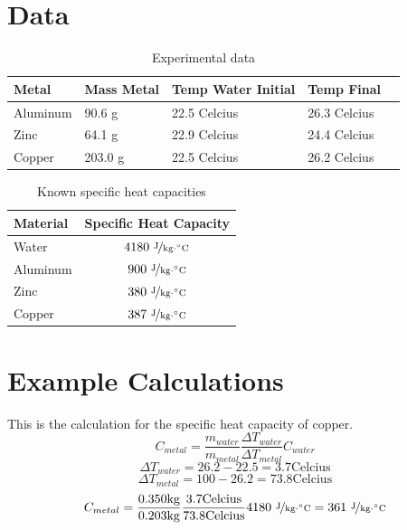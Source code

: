 \documentclass{article}
\begin{document}
\section{Data}

\begin{table}[htbp]
\begin{center}
\footnotesize
\begin{tabular}{lllll}
\toprule
 Metal   & Mass Metal & Temp Water Initial & Temp Final \\                                                      
\midrule
  
    Aluminum   & 90.6 g           & 22.5 Celcius & 26.3 Celcius   \\
    Zinc   & 64.1 g           & 22.9 Celcius  & 24.4 Celcius  \\
    Copper     & 203.0 g           & 22.5 Celcius & 26.2 Celcius  \\
    
\bottomrule
\end{tabular}
\end{center}
  \caption{Experimental data}
  \label{tab:font-sizes}
\end{table}

\begin{table}[htbp]
\begin{center}
\footnotesize
\begin{tabular}{lc}
\toprule
 Material  & Specific Heat Capacity \\                                                      
\midrule
  
    Water   & $4180\  \nicefrac{ \text{J}}{\text{kg}\cdot {}^{\circ}\text{C}}$       \\
    Aluminum   & $900\   \nicefrac{ \text{J}}{\text{kg}\cdot {}^{\circ}\text{C}}$       \\
    Zinc     & $380\  \nicefrac{ \text{J}}{\text{kg}\cdot {}^{\circ}\text{C}}$      \\
     Copper     & $387\   \nicefrac{ \text{J}}{\text{kg}\cdot {}^{\circ}\text{C}}$      \\
    
\bottomrule
\end{tabular}
\end{center}
  \caption{Known specific heat capacities}
  \label{tab:font-sizes}
\end{table}

\section{Example Calculations}
This is the calculation for the specific heat capacity of copper.
$$C_{metal}=\frac{m_{water}}{m_{metal}}  \frac{\Delta T_{water}}{\Delta T_{metal}}    C_{water}$$
$$\Delta T_{water}=26.2-22.5=3.7 \text{Celcius}$$
$$\Delta T_{metal}=100-26.2=73.8 \text{Celcius}$$
$$C_{metal}=\frac{0.350 \text{kg}}{0.203 \text{kg}}  \frac{3.7 \text{Celcius}}{73.8 \text{Celcius}}    4180\  \nicefrac{ \text{J}}{\text{kg}\cdot {}^{\circ}\text{C}}=361\  \nicefrac{ \text{J}}{\text{kg}\cdot {}^{\circ}\text{C}}$$
\end{document}
